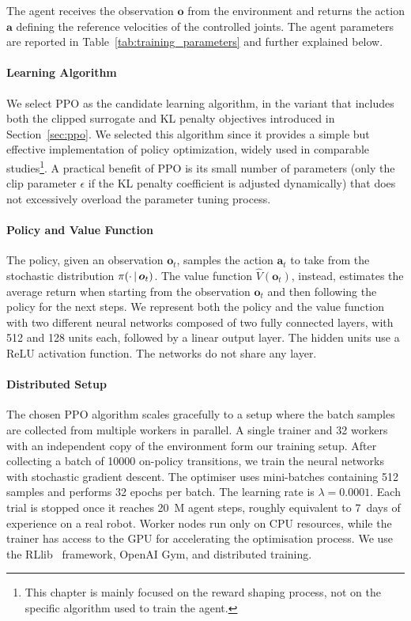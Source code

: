 The agent receives the observation $\boldsymbol{o}$ from the environment and returns the action $\mathbf{a}$ defining the reference velocities of the controlled joints.
The agent parameters are reported in Table~\ref{tab:training_parameters} and further explained below.

\paragraph{Learning Algorithm}

We select \ac{PPO} as the candidate learning algorithm, in the variant that includes both the clipped surrogate and \ac{KL} penalty objectives introduced in Section~\ref{sec:ppo}.
We selected this algorithm since it provides a simple but effective implementation of policy optimization, widely used in comparable studies\footnote{This chapter is mainly focused on the reward shaping process, not on the specific algorithm used to train the agent.}.
A practical benefit of \ac{PPO} is its small number of parameters (only the clip parameter $\epsilon$ if the \ac{KL} penalty coefficient is adjusted dynamically) that does not excessively overload the parameter tuning process.

\paragraph{Policy and Value Function}

The policy, given an observation $\boldsymbol{o}_t$, samples the action $\boldsymbol{a}_t$ to take from the stochastic distribution $\pi(\cdot \operatorname{\mid} \boldsymbol{o}_t)$.
The value function $\hat{V}(\boldsymbol{o}_t)$, instead, estimates the average return when starting from the observation $\boldsymbol{o}_t$ and then following the policy for the next steps.
We represent both the policy and the value function with two different neural networks composed of two fully connected layers, with 512 and 128 units each, followed by a linear output layer.
The hidden units use a ReLU activation function.
The networks do not share any layer.

\paragraph{Distributed Setup}

The chosen \ac{PPO} algorithm scales gracefully to a setup where the batch samples are collected from multiple workers in parallel.
A single trainer and 32 workers with an independent copy of the environment form our training setup.
After collecting a batch of 10000 on-policy transitions, we train the neural networks with stochastic gradient descent.
The optimiser uses mini-batches containing 512 samples and performs 32 epochs per batch.
The learning rate is $\lambda = 0.0001$.
Each trial is stopped once it reaches 20~M agent steps, roughly equivalent to 7~days of experience on a real robot.
Worker nodes run only on \ac{CPU} resources, while the trainer has access to the \ac{GPU} for accelerating the optimisation process.
We use the RLlib~\parencite{liang_rllib_2018} framework, OpenAI Gym, and distributed training.

